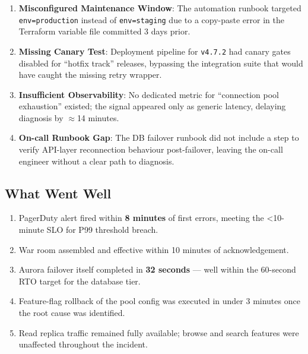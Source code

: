 \begin{enumerate}[leftmargin=*, itemsep=2pt, label=\textcolor{accent}{\bfseries\arabic*.}]
  \item \textbf{Misconfigured Maintenance Window}: The automation runbook targeted
    \texttt{env=production} instead of \texttt{env=staging} due to a copy-paste error
    in the Terraform variable file committed 3 days prior.

  \item \textbf{Missing Canary Test}: Deployment pipeline for \texttt{v4.7.2} had canary
    gates disabled for ``hotfix track'' releases, bypassing the integration suite that
    would have caught the missing retry wrapper.

  \item \textbf{Insufficient Observability}: No dedicated metric for ``connection pool
    exhaustion'' existed; the signal appeared only as generic latency, delaying diagnosis
    by $\approx$14 minutes.

  \item \textbf{On-call Runbook Gap}: The DB failover runbook did not include a step to
    verify API-layer reconnection behaviour post-failover, leaving the on-call engineer
    without a clear path to diagnosis.
\end{enumerate}

\subsection{What Went Well}

\begin{enumerate}[leftmargin=*, itemsep=2pt, label=\textcolor{statusdone}{\bfseries\arabic*.}]
  \item PagerDuty alert fired within \textbf{8 minutes} of first errors, meeting the
    \textless{}10-minute SLO for P99 threshold breach.
  \item War room assembled and effective within 10 minutes of acknowledgement.
  \item Aurora failover itself completed in \textbf{32 seconds} --- well within the
    60-second RTO target for the database tier.
  \item Feature-flag rollback of the pool config was executed in under 3 minutes once
    the root cause was identified.
  \item Read replica traffic remained fully available; browse and search features were
    unaffected throughout the incident.
\end{enumerate}

